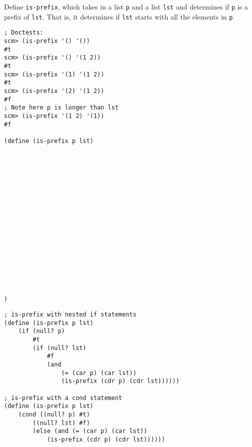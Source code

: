 \begin{blocksection}
\question Define \lstinline$is-prefix$, which takes in a list \lstinline$p$ and a list \lstinline$lst$ and determines 
if \lstinline$p$ is a prefix of \lstinline$lst$.
That is, it determines if \lstinline$lst$ starts with all the elements in \lstinline$p$.

\begin{lstlisting}
; Doctests:
scm> (is-prefix '() '())
#t
scm> (is-prefix '() '(1 2))
#t
scm> (is-prefix '(1) '(1 2))
#t
scm> (is-prefix '(2) '(1 2))
#f
; Note here p is longer than lst
scm> (is-prefix '(1 2) '(1))
#f

(define (is-prefix p lst)


















)
\end{lstlisting}
\end{blocksection}

\begin{blocksection}
\begin{solution}[.25in]
\begin{lstlisting}
; is-prefix with nested if statements
(define (is-prefix p lst)
    (if (null? p)
        #t
        (if (null? lst)
            #f
            (and
                (= (car p) (car lst))
                (is-prefix (cdr p) (cdr lst))))))

; is-prefix with a cond statement
(define (is-prefix p lst)
    (cond ((null? p) #t)
        ((null? lst) #f)
        (else (and (= (car p) (car lst))
            (is-prefix (cdr p) (cdr lst))))))
 
\end{lstlisting}
\end{solution}
\end{blocksection}
